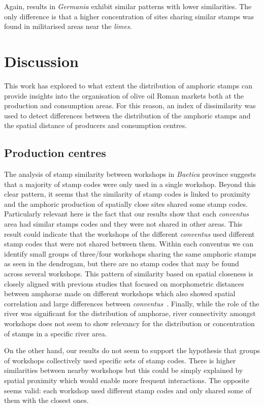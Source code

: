 Again, results in \textit{Germania} exhibit similar patterns with lower similarities. The only difference is that a higher concentration of sites sharing similar stamps was found in militarised areas near the \textit{limes}.


\section{Discussion}
\label{sec:7}

This work has explored to what extent the distribution of amphoric stamps can provide insights into the organisation of olive oil Roman markets both at the production and consumption areas. For this reason, an index of dissimilarity was used to detect differences between the distribution of the amphoric stamps and the spatial distance of producers and consumption centres. 

\subsection{Production centres}
\label{sec:7}

The analysis of stamp similarity between workshops in \textit{Baetica} province suggests that a majority of stamp codes were only used in a single workshop. Beyond this clear pattern, it seems that the similarity of stamp codes is linked to proximity and the amphoric production of spatially close sites shared some stamp codes. Particularly relevant here is the fact that our results show that each \textit{conventus} area had similar stamps codes and they were not shared in other areas. This result could indicate that the workshops of the different \textit{conventus} used different stamp codes that were not shared between them. Within each conventus we can identify small groups of three/four workshops sharing the same amphoric stamps as seen in the dendrogam, but there are no stamp codes that may be found across several workshops. This pattern of similarity based on spatial closeness is closely aligned with previous studies that focused on morphometric distances between amphorae made on different workshops which also showed spatial correlation and large differences between \textit{conventus}~\citep{coto-sarmiento_identifying_2018}. Finally, while the role of the river was significant for the distribution of amphorae, river connectivity amongst workshops does not seem to show relevancy for the distribution or concentration of stamps in a specific river area.

On the other hand, our results do not seem to support the hypothesis that groups of workshops collectively used specific sets of stamp codes. There is higher similarities between nearby workshops but this could be simply explained by spatial proximity which would enable more frequent interactions. The opposite seems valid: each workshop used different stamp codes and only shared some of them with the closest ones. 


